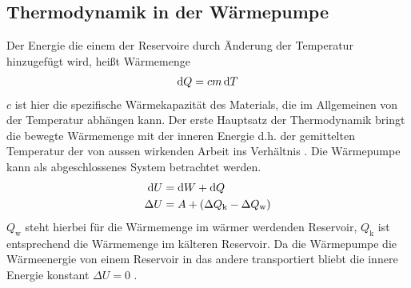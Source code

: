 \subsection{Thermodynamik in der Wärmepumpe}

Der Energie die einem der Reservoire durch Änderung der Temperatur hinzugefügt wird,
heißt Wärmemenge
\begin{align}
    \mathop{}\!\mathrm{d} Q = c m \mathop{}\!\mathrm{d} T 
    \label{eq:dQ}
\end{align} 
$ c $ ist hier die spezifische Wärmekapazität des Materials,
 die im Allgemeinen von der Temperatur abhängen kann.
Der erste Hauptsatz der Thermodynamik bringt die bewegte Wärmemenge
mit der inneren Energie d.h. der gemittelten Temperatur der von aussen wirkenden Arbeit
ins Verhältnis \cite[vgl][318]{demtroeder}. 
Die Wärmepumpe kann als abgeschlossenes System betrachtet werden. 
\begin{align}
                \mathop{}\!\mathrm{d} U &= \mathop{}\!\mathrm{d} W + \mathop{}\!\mathrm{d} Q \\
    \nonumber   \Delta U &= A + (\Delta Q_\text{k} - \Delta Q_\text{w})
\end{align}
$Q_\text{w}$ steht hierbei für die Wärmemenge im wärmer werdenden Reservoir, $Q_\text{k}$ ist entsprechend die Wärmemenge im kälteren Reservoir.
Da die Wärmepumpe die Wärmeenergie von einem Reservoir in das andere transportiert
    bliebt die innere Energie konstant $ \Delta U = 0 $ .

